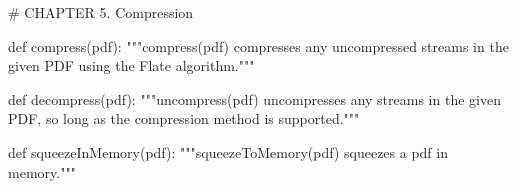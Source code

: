 # CHAPTER 5. Compression

def compress(pdf):
    """compress(pdf) compresses any uncompressed streams in the given PDF
    using the Flate algorithm."""

def decompress(pdf):
    """uncompress(pdf) uncompresses any streams in the given PDF, so long as
    the compression method is supported."""

def squeezeInMemory(pdf):
    """squeezeToMemory(pdf) squeezes a pdf in memory."""
